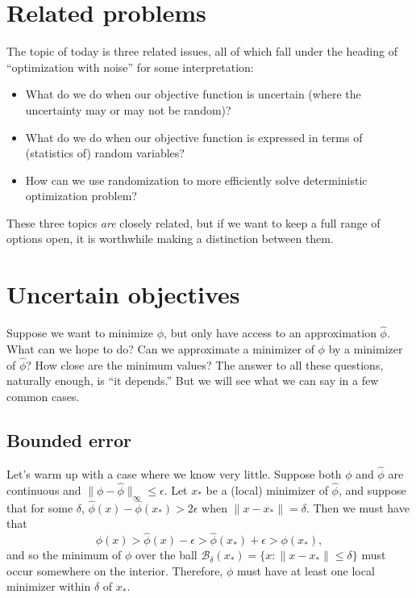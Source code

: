 \documentclass[12pt, leqno]{article} %
\providecommand{\tightlist}{%
  \setlength{\itemsep}{0pt}\setlength{\parskip}{0pt}}
\begin{document}

\section{Related problems}

The topic of today is three related issues, all of which fall under the
heading of ``optimization with noise'' for some interpretation:

\begin{itemize}
\tightlist
\item
  What do we do when our objective function is uncertain (where the
  uncertainty may or may not be random)?
\item
  What do we do when our objective function is expressed in terms of
  (statistics of) random variables?
\item
  How can we use randomization to more efficiently solve deterministic
  optimization problem?
\end{itemize}

These three topics \emph{are} closely related, but if we want to keep a
full range of options open, it is worthwhile making a distinction
between them.

\section{Uncertain objectives}

Suppose we want to minimize \(\phi\), but only have access to an
approximation \(\hat{\phi}\). What can we hope to do? Can we approximate
a minimizer of \(\phi\) by a minimizer of \(\hat{\phi}\)? How close are
the minimum values? The answer to all these questions, naturally enough,
is ``it depends.'' But we will see what we can say in a few common
cases.

\subsection{Bounded error}

Let's warm up with a case where we know very little. Suppose both
\(\phi\) and \(\hat{\phi}\) are continuous and
\(\|\phi-\hat{\phi}\|_\infty \leq \epsilon\). Let \(x_*\) be a (local)
minimizer of \(\hat{\phi}\), and suppose that for some \(\delta\),
\(\hat{\phi}(x) - \hat{\phi}(x_*) > 2\epsilon\) when
\(\|x-x_*\| = \delta\). Then we must have that
\[\phi(x) > \hat{\phi}(x)-\epsilon > \hat{\phi}(x_*) + \epsilon > \phi(x_*),\]
and so the minimum of \(\phi\) over the ball
\(\mathcal{B}_\delta(x_*) = \{x : \|x-x_*\| \leq \delta\}\) must occur
somewhere on the interior. Therefore, \(\phi\) must have at least one
local minimizer within \(\delta\) of \(x_*\).
\end{document}
